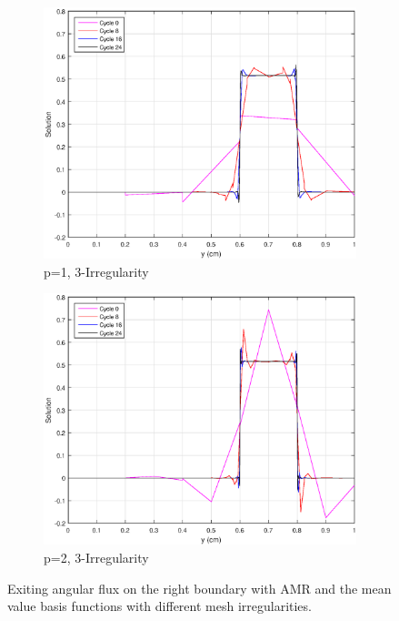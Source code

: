 \begin{figure}
{}
\vspace{2.5mm}
{
	\begin{subfigure}[b]{0.45\textwidth}
		\centering
		\label{subfig::SL_uniform_ef_mv1_irr3}
		\includegraphics[width=\textwidth]{figures/sec_BF/SL_AMR_MV_k1_Irr3.eps}
		\caption{p=1, 3-Irregularity}
	\end{subfigure}
	\hfill
	\begin{subfigure}[b]{0.45\textwidth}
		\centering
		\label{subfig::SL_uniform_ef_mv2_irr3}
		\includegraphics[width=\textwidth]{figures/sec_BF/SL_AMR_MV_k2_Irr3.eps}
		\caption{p=2, 3-Irregularity}
	\end{subfigure}
}
\caption{Exiting angular flux on the right boundary with AMR and the mean value basis functions with different mesh irregularities.}
\label{fig::BF_Results_SL_AMR_MV_exit_flux}
\end{figure}

